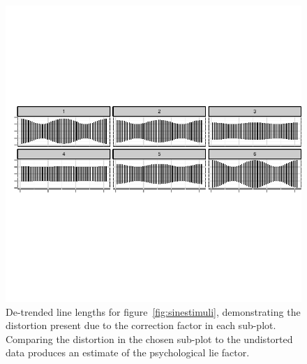\documentclass[11pt]{isuthesis}\usepackage[]{graphicx}\usepackage[]{color}
\begin{document}
\begin{figure}
\centering
\includegraphics[width=6in, trim=.65in 0in .65in 0in]{fig-stimulicorrectionsize2}
\caption{De-trended line lengths for figure~\ref{fig:sinestimuli}, demonstrating the distortion present due to the correction factor in each sub-plot. Comparing the distortion in the chosen sub-plot to the undistorted data produces an estimate of the psychological lie factor. }\label{fig:sinestimulinotrend}
\end{figure}
\end{document}
